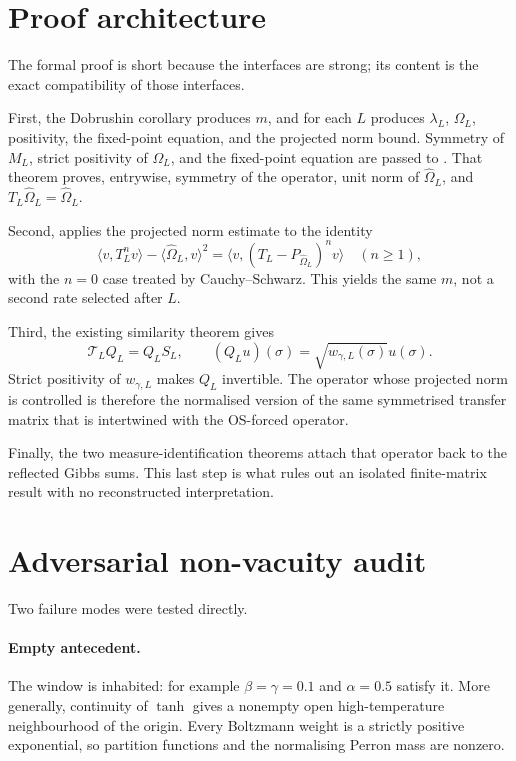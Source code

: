 \documentclass[11pt]{article}
\newcommand{\ip}[2]{\langle #1,#2\rangle}
\begin{document}
\section{Proof architecture}

The formal proof is short because the interfaces are strong; its content is
the exact compatibility of those interfaces.

First, the Dobrushin corollary produces $m$, and for each $L$ produces
$\lambda_L$, $\Omega_L$, positivity, the fixed-point equation, and the
projected norm bound.  Symmetry of $M_L$, strict positivity of $\Omega_L$,
and the fixed-point equation are passed to
. That theorem proves, entrywise, symmetry of
the operator, unit norm of $\widehat\Omega_L$, and
$T_L\widehat\Omega_L=\widehat\Omega_L$.

Second,  applies the projected norm estimate to
the identity
\[
 \ip{v}{T_L^n v}-\ip{\widehat\Omega_L}{v}^2
   =\ip{v}{(T_L-P_{\widehat\Omega_L})^n v}
 \quad(n\ge1),
\]
with the $n=0$ case treated by Cauchy--Schwarz.  This yields the same $m$,
not a second rate selected after $L$.

Third, the existing similarity theorem
 gives
\[
 \mathcal T_L Q_L=Q_L S_L,
 \qquad (Q_Lu)(\sigma)=\sqrt{w_{\gamma,L}(\sigma)}u(\sigma).
\]
Strict positivity of $w_{\gamma,L}$ makes $Q_L$ invertible.  The operator
whose projected norm is controlled is therefore the normalised version of
the same symmetrised transfer matrix that is intertwined with the OS-forced
operator.

Finally, the two measure-identification theorems attach that operator back to
the reflected Gibbs sums.  This last step is what rules out an isolated
finite-matrix result with no reconstructed interpretation.

\section{Adversarial non-vacuity audit}

Two failure modes were tested directly.

\paragraph{Empty antecedent.}
The window is inhabited: for example $\beta=\gamma=0.1$ and $\alpha=0.5$
satisfy it.  More generally, continuity of $\tanh$ gives a nonempty open
high-temperature neighbourhood of the origin.  Every Boltzmann weight is a
strictly positive exponential, so partition functions and the normalising
Perron mass are nonzero.
\end{document}

